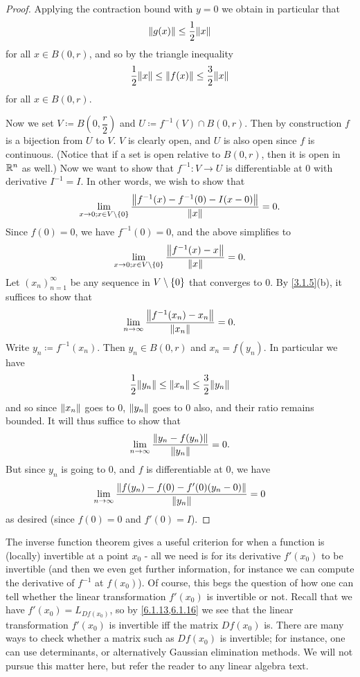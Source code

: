 \begin{proof}
  Applying the contraction bound with \(y = 0\) we obtain in particular that
  \[
    \norm*{g(x)} \leq \dfrac{1}{2} \norm*{x}
  \]
  for all \(x \in B(0, r)\), and so by the triangle inequality
  \[
    \dfrac{1}{2} \norm*{x} \leq \norm*{f(x)} \leq \dfrac{3}{2} \norm*{x}
  \]
  for all \(x \in B(0, r)\).

  Now we set \(V \coloneqq B(0, \dfrac{r}{2})\) and \(U \coloneqq f^{-1}(V) \cap B(0, r)\).
  Then by construction \(f\) is a bijection from \(U\) to \(V\).
  \(V\) is clearly open, and \(U\) is also open since \(f\) is continuous.
  (Notice that if a set is open relative to \(B(0, r)\), then it is open in \(\R^n\) as well.)
  Now we want to show that \(f^{-1} : V \to U\) is differentiable at \(0\) with derivative \(I^{-1} = I\).
  In other words, we wish to show that
  \[
    \lim_{x \to 0 ; x \in V \setminus \set{0}} \dfrac{\norm*{f^{-1}(x) - f^{-1}(0) - I(x - 0)}}{\norm*{x}} = 0.
  \]
  Since \(f(0) = 0\), we have \(f^{-1}(0) = 0\), and the above simplifies to
  \[
    \lim_{x \to 0 ; x \in V \setminus \set{0}} \dfrac{\norm*{f^{-1}(x) - x}}{\norm*{x}} = 0.
  \]
  Let \((x_n)_{n = 1}^\infty\) be any sequence in \(V \setminus \set{0}\) that converges to \(0\).
  By \cref{3.1.5}(b), it suffices to show that
  \[
    \lim_{n \to \infty} \dfrac{\norm*{f^{-1}(x_n) - x_n}}{\norm*{x_n}} = 0.
  \]
  Write \(y_n \coloneqq f^{-1}(x_n)\).
  Then \(y_n \in B(0, r)\) and \(x_n = f(y_n)\).
  In particular we have
  \[
    \dfrac{1}{2} \norm*{y_n} \leq \norm*{x_n} \leq \dfrac{3}{2} \norm*{y_n}
  \]
  and so since \(\norm*{x_n}\) goes to \(0\), \(\norm*{y_n}\) goes to \(0\) also, and their ratio remains bounded.
  It will thus suffice to show that
  \[
    \lim_{n \to \infty} \dfrac{\norm*{y_n - f(y_n)}}{\norm*{y_n}} = 0.
  \]
  But since \(y_n\) is going to \(0\), and \(f\) is differentiable at \(0\), we have
  \[
    \lim_{n \to \infty} \dfrac{\norm*{f(y_n) - f(0) - f'(0)(y_n - 0)}}{\norm*{y_n}} = 0
  \]
  as desired (since \(f(0) = 0\) and \(f'(0) = I\)).
\end{proof}

\begin{note}
  The inverse function theorem gives a useful criterion for when a function is (locally) invertible at a point \(x_0\)
  - all we need is for its derivative \(f'(x_0)\) to be invertible
  (and then we even get further information, for instance we can compute the derivative of \(f^{-1}\) at \(f(x_0)\)).
  Of course, this begs the question of how one can tell whether the linear transformation \(f'(x_0)\) is invertible or not.
  Recall that we have \(f'(x_0) = L_{D f(x_0)}\), so by \cref{6.1.13,6.1.16} we see that the linear transformation \(f'(x_0)\) is invertible iff the matrix \(D f(x_0)\) is.
  There are many ways to check whether a matrix such as \(D f(x_0)\) is invertible;
  for instance, one can use determinants, or alternatively Gaussian elimination methods.
  We will not pursue this matter here, but refer the reader to any linear algebra text.
\end{note}

